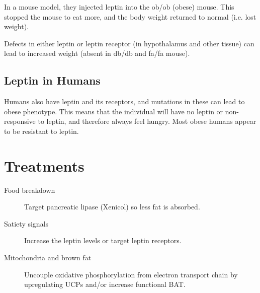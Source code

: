 \begin{center}
\end{center}

In a mouse model, they injected leptin into the ob/ob (obese) mouse.
This stopped the mouse to eat more, and the body weight returned to normal (i.e. lost weight).

Defects in either leptin or leptin receptor (in hypothalamus and other tissue) can lead to increased weight (absent in db/db and fa/fa mouse).

\subsection{Leptin in Humans}

Humans also have leptin and its receptors, and mutations in these can lead to obese phenotype.
This means that the individual will have no leptin or non-responsive to leptin, and therefore always feel hungry.
Most obese humans appear to be resistant to leptin.

\section{Treatments}

\begin{description}
\item[Food breakdown] Target pancreatic lipase (Xenicol) so less fat is absorbed.
\item[Satiety signals] Increase the leptin levels or target leptin receptors.
\item[Mitochondria and brown fat] Uncouple oxidative phosphorylation from electron transport chain by upregulating UCPs and/or increase functional BAT.
\end{description}

